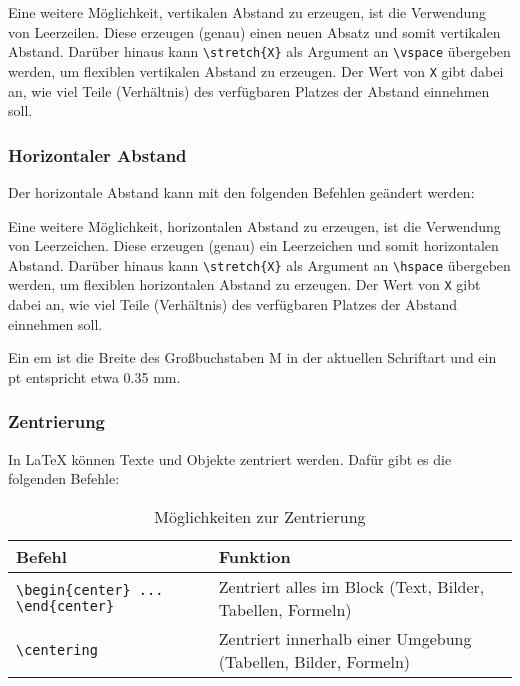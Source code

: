 Eine weitere Möglichkeit, vertikalen Abstand zu erzeugen, ist die Verwendung von Leerzeilen. Diese erzeugen (genau) einen neuen Absatz und somit vertikalen Abstand.
Darüber hinaus kann \texttt{\textbackslash stretch\{X\}} als Argument an \texttt{\textbackslash vspace} übergeben werden, um flexiblen vertikalen Abstand zu erzeugen. Der Wert von \texttt{X} gibt dabei an, wie viel Teile (Verhältnis) des verfügbaren Platzes der Abstand einnehmen soll.

\subsubsection{Horizontaler Abstand}
Der horizontale Abstand kann mit den folgenden Befehlen geändert werden:



Eine weitere Möglichkeit, horizontalen Abstand zu erzeugen, ist die Verwendung von Leerzeichen. Diese erzeugen (genau) ein Leerzeichen und somit horizontalen Abstand.
Darüber hinaus kann \texttt{\textbackslash stretch\{X\}} als Argument an \texttt{\textbackslash hspace} übergeben werden, um flexiblen horizontalen Abstand zu erzeugen. Der Wert von \texttt{X} gibt dabei an, wie viel Teile (Verhältnis) des verfügbaren Platzes der Abstand einnehmen soll.

Ein em ist die Breite des Großbuchstaben M in der aktuellen Schriftart und ein pt entspricht etwa 0.35 mm.

\subsubsection{Zentrierung}
In LaTeX können Texte und Objekte zentriert werden. Dafür gibt es die folgenden Befehle:
\begin{table}[H]
    \centering
    \begin{tabular}{lp{6cm}c}
        \toprule
        \textbf{Befehl} & \textbf{Funktion}                                              \\
        \midrule
        \texttt{\textbackslash begin\{center\} ... \textbackslash end\{center\}}
                        & Zentriert alles im Block (Text, Bilder, Tabellen, Formeln)     \\

        \texttt{\textbackslash centering}
                        & Zentriert innerhalb einer Umgebung (Tabellen, Bilder, Formeln) \\
        \bottomrule
    \end{tabular}
    \caption{Möglichkeiten zur Zentrierung}
    \label{tab:center_vs_centering}
\end{table}


